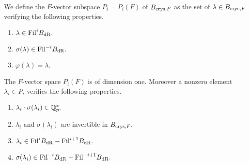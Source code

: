 \documentclass[11pt]{amsart}
\begin{document}
\begin{definition}\label{defpiram}
We define the $F$-vector subspace $P_i=P_i(F)$ of $B_{\textnormal{crys},F}$ as the set of $\lambda \in B_{\textnormal{crys},F}$ verifying the following properties.
\begin{enumerate}

\item $\lambda \in \textnormal{Fil} ^i B_{\mathrm{dR}}.$
\item $\sigma(\lambda) \in \textnormal{Fil} ^{-i} B_{\mathrm{dR}}.$
\item $\varphi (\lambda)= \lambda.$
\end{enumerate}
\end{definition}

\begin{proposition}\label{lemmapiram} The $F$-vector space  $P_i(F)$ is of dimension one. 
Moreover a nonzero element $\lambda_i \in P_i$  verifies the following properties.
\begin{enumerate}
 \item  $\lambda_i \cdot\sigma(\lambda_i) \in \mathbb{Q}^*_p.$
  \item  $\lambda_i$ and $\sigma(\lambda_i)$ are invertible in $B_{\textnormal{crys},F}.$
\item  $\lambda_i \in \textnormal{Fil} ^i B_{\mathrm{dR}}-\textnormal{Fil} ^{i+1} B_{\mathrm{dR}}.$
\item  $\sigma(\lambda_i) \in \textnormal{Fil} ^{-i} B_{\mathrm{dR}}-\textnormal{Fil} ^{-i+1} B_{\mathrm{dR}}.$
\end{enumerate}
\end{proposition}
\end{document}
